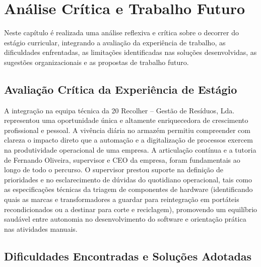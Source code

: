 \chapter{Análise Crítica e Trabalho Futuro}\label{chap6}
\thispagestyle{fancy}

Neste capítulo é realizada uma análise reflexiva e crítica sobre o decorrer do estágio curricular, integrando a avaliação da experiência de trabalho, as dificuldades enfrentadas, as limitações identificadas nas soluções desenvolvidas, as sugestões organizacionais e as propostas de trabalho futuro.

\section{Avaliação Crítica da Experiência de Estágio}

A integração na equipa técnica da 20 Recolher -- Gestão de Resíduos, Lda. representou uma oportunidade única e altamente enriquecedora de crescimento profissional e pessoal. A vivência diária no armazém permitiu compreender com clareza o impacto direto que a automação e a digitalização de processos exercem na produtividade operacional de uma empresa. A articulação contínua e a tutoria de Fernando Oliveira, supervisor e CEO da empresa, foram fundamentais ao longo de todo o percurso. O supervisor prestou suporte na definição de prioridades e no esclarecimento de dúvidas do quotidiano operacional, tais como as especificações técnicas da triagem de componentes de hardware (identificando quais as marcas e transformadores a guardar para reintegração em portáteis recondicionados ou a destinar para corte e reciclagem), promovendo um equilíbrio saudável entre autonomia no desenvolvimento do software e orientação prática nas atividades manuais.

\section{Dificuldades Encontradas e Soluções Adotadas}

